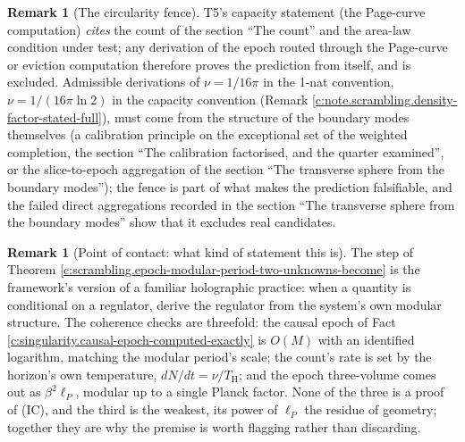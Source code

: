 \documentclass[11pt]{article}
\theoremstyle{definition}
\newtheorem{remark}[theorem]{Remark}
\theoremstyle{plain}
\providecommand{\TH}{}\renewcommand{\TH}{T_{\mathrm{H}}}
\providecommand{\lP}{}\renewcommand{\lP}{\ell_{P}}
\begin{document}
\begin{remark}[The circularity fence]\label{c:note.scrambling.circularity-fence}
T5's capacity statement (the Page-curve computation) \emph{cites} the count of the section ``The count'' and the area-law condition under test; any derivation of the epoch routed through the Page-curve or eviction computation therefore proves the prediction from itself, and is excluded. Admissible derivations of $\nu = 1/16\pi$ in the 1-nat convention, $\nu = 1/(16\pi\ln 2)$ in the capacity convention (Remark \ref{c:note.scrambling.density-factor-stated-full}), must come from the structure of the boundary modes themselves (a calibration principle on the exceptional set of the weighted completion, the section ``The calibration factorised, and the quarter examined'', or the slice-to-epoch aggregation of the section ``The transverse sphere from the boundary modes''); the fence is part of what makes the prediction falsifiable, and the failed direct aggregations recorded in the section ``The transverse sphere from the boundary modes'' show that it excludes real candidates.
\end{remark}

\begin{remark}[Point of contact: what kind of statement this is]\label{c:note.scrambling.point-contact-what-kind-statement}
The step of Theorem \ref{c:scrambling.epoch-modular-period-two-unknowns-become} is the framework's version of a familiar holographic practice: when a quantity is conditional on a regulator, derive the regulator from the system's own modular structure. The coherence checks are threefold: the causal epoch of Fact \ref{c:singularity.causal-epoch-computed-exactly} is $O(M)$ with an identified logarithm, matching the modular period's scale; the count's rate is set by the horizon's own temperature, $dN/dt = \nu/\TH$; and the epoch three-volume comes out as $\beta^2\lP$, modular up to a single Planck factor. None of the three is a proof of (IC), and the third is the weakest, its power of $\lP$ the residue of geometry; together they are why the premise is worth flagging rather than discarding.
\end{remark}
\end{document}
